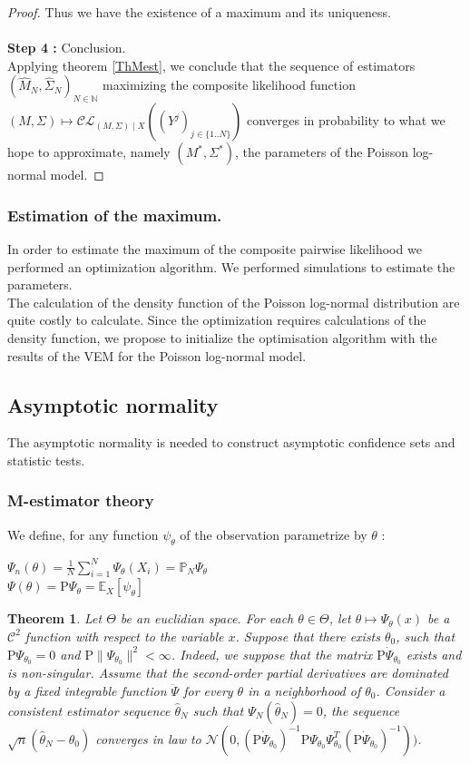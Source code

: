 \documentclass[11pt, a4paper]{article}
\newtheorem{theorem}{Theorem}
\begin{document}
\begin{proof}
Thus we have the existence of a maximum and its uniqueness.\\
\\
\textbf{Step 4 :} Conclusion.\\
Applying theorem \ref{ThMest}, we conclude that the sequence of estimators $(\widehat{M}_N, \widehat{\Sigma}_N)_{N \in \mathbb{N}}$ maximizing the composite likelihood function $(M,\Sigma) \mapsto \mathcal{CL}_{(M,\Sigma) \mid X}((Y^j)_{j \in \{1..N\}})$  converges in probability to what we hope to approximate, namely $(M^\ast, \Sigma^\ast)$, the parameters of the Poisson log-normal model.
\end{proof}
\subsubsection{Estimation of the maximum.}
In order to estimate the maximum of the composite pairwise likelihood we performed an optimization algorithm. We  performed simulations to estimate the parameters.\\
The calculation of the density function of the Poisson log-normal distribution are quite costly to calculate. Since the optimization requires calculations of the density function, we propose to initialize the optimisation algorithm with the results of the VEM for the Poisson log-normal model.
\subsection{Asymptotic normality}
The asymptotic normality is needed to construct asymptotic confidence sets and statistic tests.
\subsubsection{M-estimator theory}
We define, for any function $\psi_{\theta}$ of the observation parametrize by $\theta$ :
\begin{center}
$\Psi_n(\theta)=\frac{1}{N}\sum_{i=1}^N \Psi_\theta(X_i) = \mathbb{P}_N \Psi_\theta$\\
$\Psi(\theta) = \mathrm{P}\Psi_\theta = \mathbb{E}_X[\psi_{\theta}]$
\end{center}
\begin{theorem} \cite{vaart_1998} \label{ThAN}
Let $\Theta$ be an euclidian space. For each $\theta \in \Theta$, let $\theta \mapsto \Psi_\theta (x)$ be a $\mathcal{C}^2$ function with respect to the variable $x$. Suppose that there exists $\theta_0$, such that $\mathrm{P} \Psi_{\theta_0} =0 $ and $\mathrm{P} \parallel \Psi_{\theta_0} \parallel^2 < \infty$. Indeed, we suppose that the matrix $\mathrm{P} \dot{\Psi}_{\theta_0}$ exists and is non-singular. Assume that the second-order partial derivatives are dominated by a fixed integrable function  $\ddot{\Psi}$ for every $\theta$ in a neighborhood of $\theta_0$. Consider a consistent estimator sequence $\widehat{\theta}_N$ such that $\Psi_N(\widehat{\theta}_N)=0$, the sequence $\sqrt{n}(\widehat{\theta}_N - \theta_0)$ converges in law to $\mathcal{N}(0,(\mathrm{P} \dot{\Psi}_{\theta_0})^{-1} \mathrm{P} \Psi_{\theta_0}  \Psi_{\theta_0}^T (\mathrm{P} \dot{\Psi}_{\theta_0})^{-1}))$.
\end{theorem}
\end{document}
